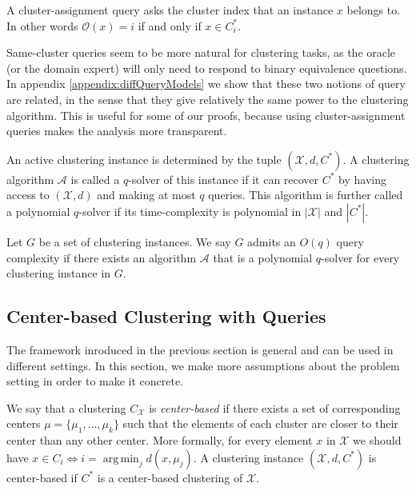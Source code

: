 \documentclass[orivec]{llncs}
\newcommand{\mc}{\mathcal}
\DeclareMathOperator*{\argmin}{arg\,min}
\begin{document}
\begin{definition}
A cluster-assignment query asks the cluster index that an instance $x$ belongs to. In other words ${\mc O}(x) = i$ if and only if $x \in C^*_i$.
\end{definition}

Same-cluster queries seem to be more natural for clustering tasks, as the oracle (or the domain expert) will only need to respond to binary equivalence questions. In appendix \ref{appendix:diffQueryModels} we show that these two notions of query are related, in the sense that they give relatively the same power to the clustering algorithm. This is useful for some of our proofs, because using cluster-assignment queries makes the analysis more transparent.

An active clustering instance is determined by the tuple $(\mc X, d, C^*)$. A clustering algorithm $\mc A$ is called a $q$-solver of this instance if it can recover $C^*$ by having access to $(\mc X, d)$ and making at most $q$ queries. This algorithm is further called a polynomial $q$-solver if its time-complexity is polynomial in $|\mc X|$ and $|C^*|$.

\begin{definition}
\label{definition:QueryComplexity}
Let $G$ be a set of clustering instances. We say $G$ admits an $O(q)$ query complexity if there exists an algorithm $\mc A$ that is a polynomial $q$-solver for every clustering instance in $G$.
\end{definition}

\subsection{Center-based Clustering with Queries}

The framework inroduced in the previous section is general and can be used in different settings. In this section, we make more assumptions about the problem setting in order to make it concrete.

We say that a clustering $C_{\mc X}$ is \emph{center-based} if there exists a set of corresponding centers $\mc \mu = \{\mu_1, \ldots, \mu_k\}$ such that the elements of each cluster are closer to their center than any other center. More formally, for every element $x$ in $\mc X$ we should have $x\in C_i \Leftrightarrow i=\argmin_j d(x,\mu_j)$. A clustering instance $(\mc X, d, C^*)$ is center-based if $C^*$ is a center-based clustering of $\mc X$.
\end{document}
